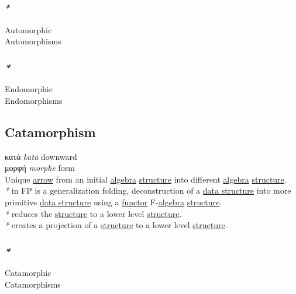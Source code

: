 \documentclass[a4paper,14pt,oneside]{book}
\begin{document}
{\paragraph{\emph{*}}
\label{sec:orga45cf98}

\label{orga54dc66}Automorphic\\
\label{org84994ec}Automorphisms\\

\subsubsection{\emph{*}}
\label{sec:org2705294}

\label{org29ba25d}Endomorphic\\
\label{orgd6cd7f9}Endomorphisms\\

\subsection{\label{org524224c}Catamorphism}
\label{sec:orgddceda0}
κατά \emph{kata} downward\\
μορφή \emph{morphe} form\\

Unique \hyperref[org4ef5cf1]{arrow} from an initial \hyperref[org8f571f3]{algebra} \hyperref[org080800e]{structure} into different \hyperref[org8f571f3]{algebra} \hyperref[org080800e]{structure}.\\

\emph{*} in FP is a generalization folding, deconstruction of a \hyperref[orgbe03dd5]{data structure} into more primitive \hyperref[orgbe03dd5]{data structure} using a \hyperref[orgba8e41d]{functor} F-\hyperref[org8f571f3]{algebra} \hyperref[org080800e]{structure}.\\

\emph{*} reduces the \hyperref[org080800e]{structure} to a lower level \hyperref[org080800e]{structure}.\\
\emph{*} creates a projection of a \hyperref[org080800e]{structure} to a lower level \hyperref[org080800e]{structure}.\\

\subsubsection{\emph{*}}
\label{sec:org411922f}

\label{orgfa15351}Catamorphic\\
\label{orgcb74b33}Catamorphisms\\

}
\end{document}
